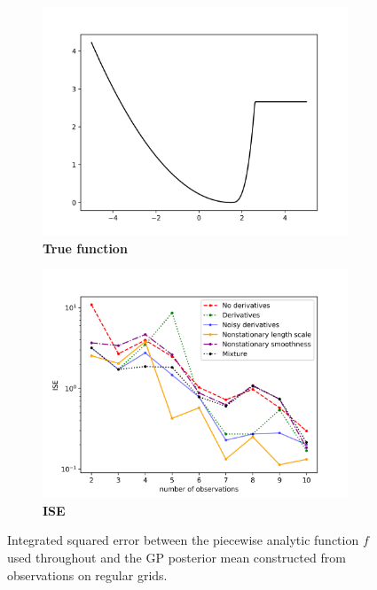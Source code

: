 \documentclass{article}
\numberwithin{equation}{section}
\begin{document}
\begin{figure}
		\centering
		\captionsetup{justification=centering}
    \begin{subfigure}[b]{.5\textwidth}
      \centering
      \includegraphics[scale=0.4]{figures/kink.png}
      \caption{\textbf{True function}}
    \end{subfigure}%
    \begin{subfigure}[b]{.5\textwidth}
      \centering
      \includegraphics[scale=0.4]{figures/regular-1D-all.png}
      \caption{\textbf{ISE}}
    \end{subfigure}
		\caption{Integrated squared error between the piecewise analytic function $f$ used throughout and the GP posterior mean constructed from observations on regular grids.}
		\label{regular-1D}
\end{figure}
\end{document}
